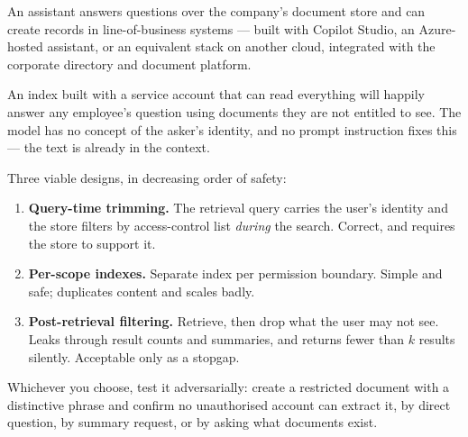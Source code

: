 An assistant answers questions over the company's document store and can
create records in line-of-business systems --- built with Copilot Studio, an
Azure-hosted assistant, or an equivalent stack on another cloud, integrated
with the corporate directory and document platform.

\begin{cautionbox}
An index built with a service account that can read everything will happily
answer any employee's question using documents they are not entitled to see.
The model has no concept of the asker's identity, and no prompt instruction
fixes this --- the text is already in the context.

Three viable designs, in decreasing order of safety:
\begin{enumerate}
  \item \textbf{Query-time trimming.} The retrieval query carries the user's
        identity and the store filters by access-control list \emph{during}
        the search. Correct, and requires the store to support it.
  \item \textbf{Per-scope indexes.} Separate index per permission boundary.
        Simple and safe; duplicates content and scales badly.
  \item \textbf{Post-retrieval filtering.} Retrieve, then drop what the user
        may not see. Leaks through result counts and summaries, and returns
        fewer than $k$ results silently. Acceptable only as a stopgap.
\end{enumerate}
Whichever you choose, test it adversarially: create a restricted document with
a distinctive phrase and confirm no unauthorised account can extract it, by
direct question, by summary request, or by asking what documents exist.
\end{cautionbox}

